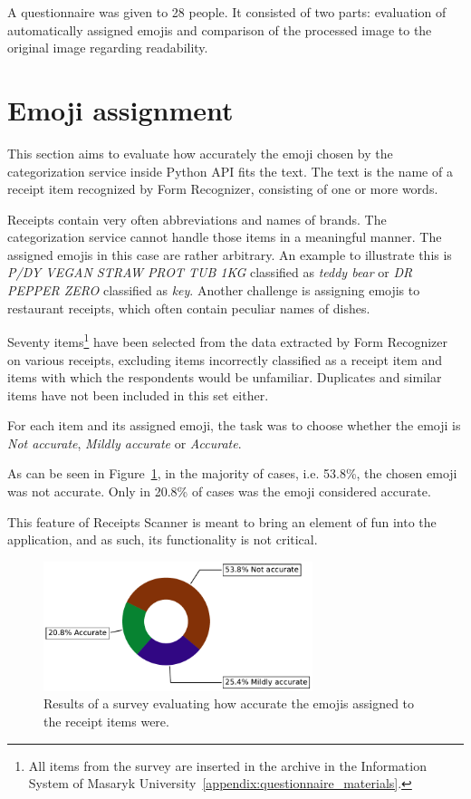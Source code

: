 \documentclass[
  digital, %
  table,   %
  oneside, %
  lof,     %
  lot,     %
]{fithesis3}
\begin{document}
A questionnaire was given to 28 people. It consisted of two parts: evaluation of automatically assigned emojis and comparison of the processed image to the original image regarding readability.

\section{Emoji assignment}
This section aims to evaluate how accurately the emoji chosen by the categorization service inside Python API fits the text. The text is the name of a receipt item recognized by Form Recognizer, consisting of one or more words.

Receipts contain very often abbreviations and names of brands. The categorization service cannot handle those items in a meaningful manner. The assigned emojis in this case are rather arbitrary. An example to illustrate this is \textit{P/DY VEGAN STRAW PROT TUB 1KG} classified as \textit{ teddy bear} or \textit{DR PEPPER ZERO} classified as \textit{ key}. Another challenge is assigning emojis to restaurant receipts, which often contain peculiar names of dishes.

Seventy items\footnote{All items from the survey are inserted in the archive in the Information System of Masaryk University~\ref{appendix:questionnaire_materials}.} have been selected from the data extracted by Form Recognizer on various receipts, excluding items incorrectly classified as a receipt item and items with which the respondents would be unfamiliar. Duplicates and similar items have not been included in this set either.

For each item and its assigned emoji, the task was to choose whether the emoji is \textit{Not accurate}, \textit{Mildly accurate} or \textit{Accurate}.

As can be seen in Figure~\ref{fig:quality_of_emojis}, in the majority of cases, i.e. 53.8\%, the chosen emoji was not accurate. Only in 20.8\% of cases was the emoji considered accurate.

This feature of Receipts Scanner is meant to bring an element of fun into the application, and as such, its functionality is not critical. 

\begin{figure}
    \begin{center}
        \includegraphics[width=0.7\textwidth]{figures/graphs/quality_of_emojis}
    \end{center}
    \caption{Results of a survey evaluating how accurate the emojis assigned to the receipt items were.}
    \label{fig:quality_of_emojis}
\end{figure}
\end{document}
